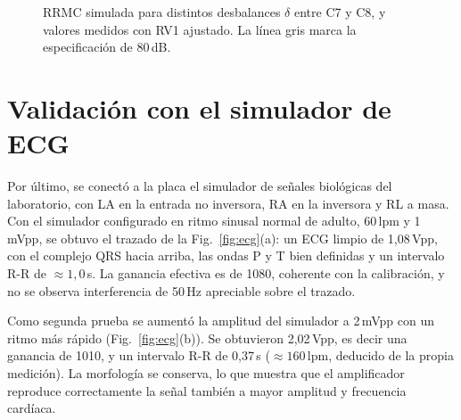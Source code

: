 \documentclass[journal,a4paper]{IEEEtran}
\begin{document}
\begin{figure}[!t]
\centering
{}
\caption{RRMC simulada para distintos desbalances $\delta$ entre C7 y C8, y valores medidos con RV1 ajustado. La línea gris marca la especificación de 80\,dB.}
\label{fig:rrmcsim}
\end{figure}

\section{Validación con el simulador de ECG}

Por último, se conectó a la placa el simulador de señales biológicas del laboratorio, con LA en la entrada no inversora, RA en la inversora y RL a masa. Con el simulador configurado en ritmo sinusal normal de adulto, 60\,lpm y 1\,mVpp, se obtuvo el trazado de la Fig.~\ref{fig:ecg}(a): un ECG limpio de 1,08\,Vpp, con el complejo QRS hacia arriba, las ondas P y T bien definidas y un intervalo R-R de $\approx 1{,}0$\,s. La ganancia efectiva es de 1080, coherente con la calibración, y no se observa interferencia de 50\,Hz apreciable sobre el trazado.

Como segunda prueba se aumentó la amplitud del simulador a 2\,mVpp con un ritmo más rápido (Fig.~\ref{fig:ecg}(b)). Se obtuvieron 2,02\,Vpp, es decir una ganancia de 1010, y un intervalo R-R de 0,37\,s ($\approx 160$\,lpm, deducido de la propia medición). La morfología se conserva, lo que muestra que el amplificador reproduce correctamente la señal también a mayor amplitud y frecuencia cardíaca.
\end{document}
